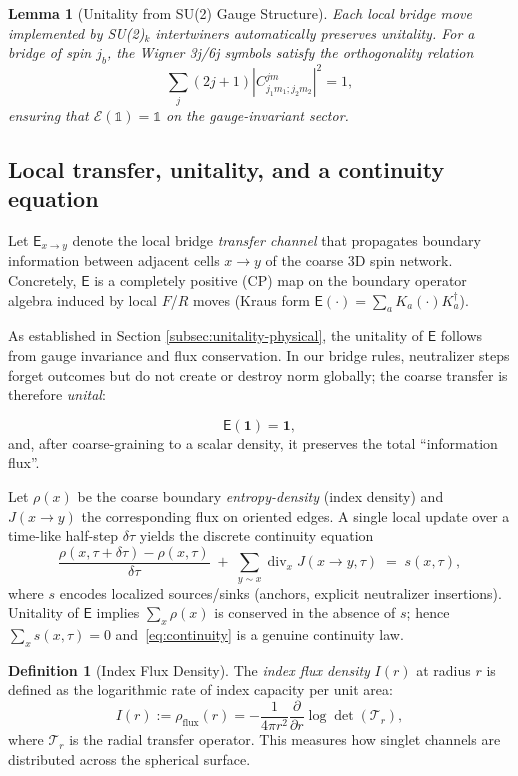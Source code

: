 \documentclass[11pt]{article}
\theoremstyle{plain}
\newtheorem{lemma}[theorem]{Lemma}
\theoremstyle{definition}
\newtheorem{definition}[theorem]{Definition}
\begin{document}
\begin{lemma}[Unitality from SU(2) Gauge Structure]
  Each local bridge move implemented by SU(2)$_k$ intertwiners automatically preserves unitality. For a bridge of spin $j_b$, the Wigner 3j/6j symbols satisfy the orthogonality relation
  \[
    \sum_j (2j+1) |C^{jm}_{j_1 m_1; j_2 m_2}|^2 = 1,
  \]
  ensuring that $\mathcal{E}(\mathbb{1}) = \mathbb{1}$ on the gauge-invariant sector.
\end{lemma}

\subsection{Local transfer, unitality, and a continuity equation}
Let $\mathsf{E}_{x\to y}$ denote the local bridge \emph{transfer channel} that propagates boundary information between adjacent cells $x\to y$ of the coarse 3D spin network.
Concretely, $\mathsf{E}$ is a completely positive (CP) map on the boundary operator algebra induced by local $F$/$R$ moves (Kraus form $\mathsf{E}(\cdot)=\sum_a K_a(\cdot)K_a^\dagger$).

As established in Section \ref{subsec:unitality-physical}, the unitality of $\mathsf{E}$ follows from gauge invariance and flux conservation. In our bridge rules, neutralizer steps forget outcomes but do not create or destroy norm globally; the coarse transfer is therefore \emph{unital}:

\[
  \mathsf{E}(\mathbf{1})=\mathbf{1},
\]
and, after coarse-graining to a scalar density, it preserves the total “information flux”.

Let $\rho(x)$ be the coarse boundary \emph{entropy-density} (index density) and $J(x\!\to\!y)$ the corresponding flux on oriented edges.
A single local update over a time-like half-step $\delta \tau$ yields the discrete continuity equation
\begin{equation}\label{eq:continuity}
  \frac{\rho(x,\tau+\delta\tau)-\rho(x,\tau)}{\delta\tau}
  \;+\;\sum_{y\sim x}\! \operatorname{div}_x J(x\!\to\!y,\tau)
  \;=\; s(x,\tau),
\end{equation}
where $s$ encodes localized sources/sinks (anchors, explicit neutralizer insertions).
Unitality of $\mathsf{E}$ implies $\sum_x \rho(x)$ is conserved in the absence of $s$; hence $\sum_x s(x,\tau)=0$ and~\eqref{eq:continuity} is a genuine continuity law.

\begin{definition}[Index Flux Density]
  The \emph{index flux density} $I(r)$ at radius $r$ is defined as the logarithmic rate of index capacity per unit area:
  \[
    I(r) := \rho_{\text{flux}}(r) = -\frac{1}{4\pi r^2} \frac{\partial}{\partial r} \log \det(\mathcal{T}_r),
  \]
  where $\mathcal{T}_r$ is the radial transfer operator. This measures how singlet channels are distributed across the spherical surface.
\end{definition}
\end{document}
